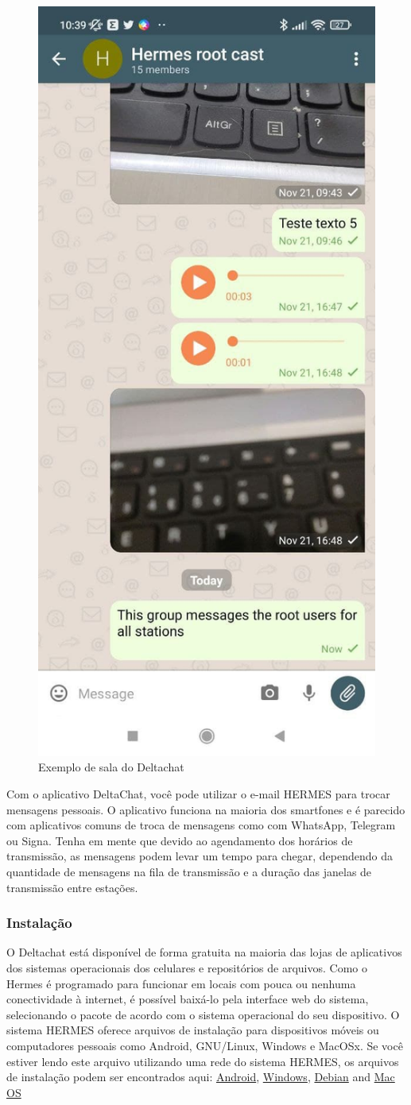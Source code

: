 \documentclass[11pt,a4paper]{article}
\begin{document}
\begin{figure}[H]
    \centering
    \includegraphics[width=0.3\columnwidth]{screenshots/deltachat/en/chatroom.jpg}
    	\caption{Exemplo de sala do Deltachat}
	\vspace{-10pt}
    \label{fig:deltachat-chatroom}
\end{figure}

Com o aplicativo DeltaChat, você pode utilizar o e-mail HERMES para trocar mensagens pessoais. O aplicativo funciona na maioria dos smartfones e é parecido com aplicativos comuns de troca de mensagens como com WhatsApp, Telegram ou Signa. Tenha em mente que devido ao agendamento dos horários de transmissão, as mensagens podem levar um tempo para chegar, dependendo da quantidade de mensagens na fila de transmissão e a duração das janelas de transmissão entre estações. 


\subsubsection{Instalação}

O Deltachat está disponível de forma gratuita na maioria das lojas de aplicativos dos sistemas operacionais dos celulares e repositórios de arquivos. Como o Hermes é programado para funcionar em locais com pouca ou nenhuma conectividade à internet, é possível baixá-lo pela interface web do sistema, selecionando o pacote de acordo com o sistema operacional do seu dispositivo. O sistema HERMES oferece arquivos de instalação para dispositivos móveis ou computadores pessoais como Android, GNU/Linux, Windows e MacOSx. Se você estiver lendo este arquivo utilizando uma rede do sistema HERMES, os arquivos de instalação podem ser encontrados aqui: \href{ http://10.0.0.1/dowloads/deltachat.apk}{Android},  \href{ http://10.0.0.1/dowloads/deltachat.exe}{Windows},  \href{ http://10.0.0.1/dowloads/deltachat.deb}{Debian} and \href{http://10.0.0.1/dowloads/deltachat.dmg}{Mac OS}
\end{document}
